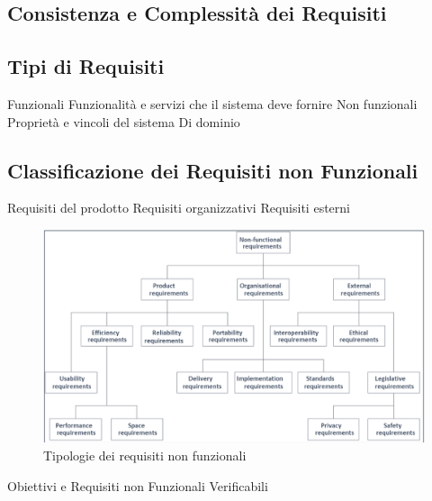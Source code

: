 \documentclass{article}
\begin{document}
	\subsection{Consistenza e Complessità dei Requisiti}
	\subsection{Tipi di Requisiti}
	Funzionali
	Funzionalità e servizi che il sistema deve fornire
	Non funzionali
	Proprietà e vincoli del sistema
	Di dominio
	\subsection{Classificazione dei Requisiti non Funzionali}
	Requisiti del prodotto
	Requisiti organizzativi
	Requisiti esterni
	\begin{figure}[h]
		\centering
		\includegraphics[scale=0.3]{11.tipi_ric_non_func.png}
		\caption{Tipologie dei requisiti non funzionali}
		\label{fig:im-11}
	\end{figure}
	Obiettivi e Requisiti non Funzionali Verificabili
\end{document}
